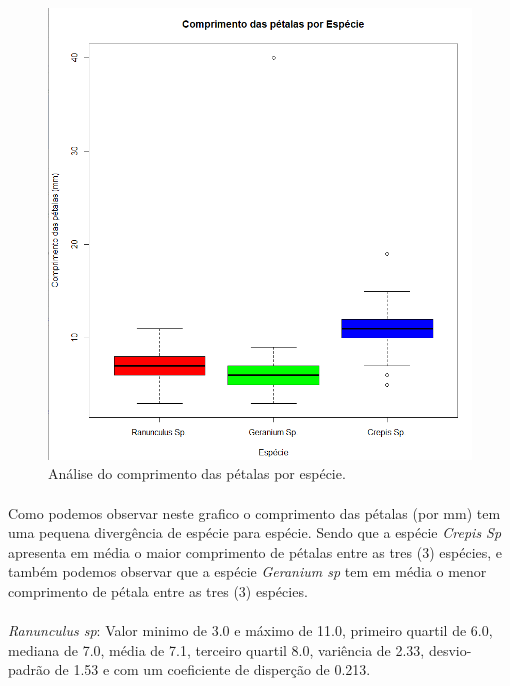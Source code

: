 \documentclass{article}
\begin{document}
\begin{figure}[h]
       \centering %
        \includegraphics[scale=0.6]{analise comprimento por especie.png}
       \caption{Análise do comprimento das pétalas por espécie.}
       \label{fig:logo}
    \end{figure}
    
\paragraph{} Como podemos observar neste grafico o comprimento das pétalas (por mm) tem uma pequena divergência de espécie para espécie. Sendo que a espécie \textit{Crepis Sp} apresenta em média o maior comprimento de pétalas entre as tres (3) espécies, e também podemos observar que a espécie \textit{Geranium sp} tem em média o menor comprimento de pétala entre as tres (3) espécies.

\paragraph{}\textit{Ranunculus sp}: Valor minimo de 3.0 e máximo de 11.0, primeiro quartil de 6.0, mediana de 7.0, média de 7.1,  terceiro quartil 8.0, variência de 2.33, desvio-padrão de 1.53 e com um coeficiente de disperção de 0.213.
\end{document}
